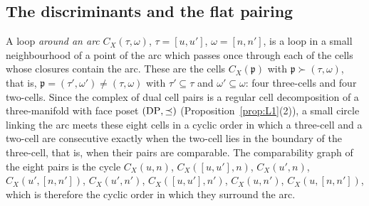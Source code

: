 \subsection{The discriminants and the flat pairing}\label{ssec:leg-disc}
A loop \emph{around an arc} $C_X(\tau,\omega)$, $\tau=[u,u']$, $\omega=[n,n']$, is a loop in a small neighbourhood of a
point of the arc which passes once through each of the cells whose closures contain the arc. These are the cells
$C_X({\mathfrak p})$ with ${\mathfrak p}\succ(\tau,\omega)$, that is, ${\mathfrak p}=(\tau',\omega')\neq(\tau,\omega)$ with $\tau'\subseteq\tau$ and
$\omega'\subseteq\omega$: four three-cells and four two-cells. Since the complex of dual cell pairs is a regular cell decomposition
of a three-manifold with face poset $(\mathrm{DP},\preceq)$ (Proposition~\ref{prop:L1}(2)), a small circle linking the arc
meets these eight cells in a cyclic order in which a three-cell and a two-cell are consecutive exactly when the two-cell
lies in the boundary of the three-cell, that is, when their pairs are comparable. The comparability graph of the eight
pairs is the cycle
$C_X(u,n)$, $C_X([u,u'],n)$, $C_X(u',n)$, $C_X(u',[n,n'])$, $C_X(u',n')$, $C_X([u,u'],n')$, $C_X(u,n')$,
$C_X(u,[n,n'])$, which is therefore the cyclic order in which they surround the arc.

